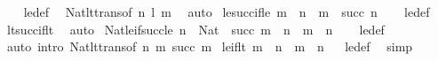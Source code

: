\begin{isabellebody}
%
\isadelimproof
\ \ %
\endisadelimproof
%
\isatagproof
{}\isamarkupfalse%
\ le{\isacharunderscore}{\kern0pt}def\ \isamarkupfalse%
\ Nat{\isacharunderscore}{\kern0pt}lt{\isacharunderscore}{\kern0pt}trans{\isacharbrackleft}{\kern0pt}of\ n\ l\ m{\isacharbrackright}{\kern0pt}\ \isamarkupfalse%
\ auto%
\endisatagproof
{\isafoldproof}%
%
\isadelimproof
\isanewline
%
\endisadelimproof
\isanewline
{}\isamarkupfalse%
\ le{\isacharunderscore}{\kern0pt}succ{\isacharunderscore}{\kern0pt}if{\isacharunderscore}{\kern0pt}le{\isacharcolon}{\kern0pt}\ {\isachardoublequoteopen}m\ {\isasymle}\ n\ {\isasymLongrightarrow}\ m\ {\isasymle}\ succ\ n{\isachardoublequoteclose}\isanewline
%
\isadelimproof
\ \ %
\endisadelimproof
%
\isatagproof
{}\isamarkupfalse%
\ le{\isacharunderscore}{\kern0pt}def\ \isamarkupfalse%
\ lt{\isacharunderscore}{\kern0pt}succ{\isacharunderscore}{\kern0pt}if{\isacharunderscore}{\kern0pt}lt\ \isamarkupfalse%
\ auto%
\endisatagproof
{\isafoldproof}%
%
\isadelimproof
\isanewline
%
\endisadelimproof
\isanewline
{}\isamarkupfalse%
\ Nat{\isacharunderscore}{\kern0pt}le{\isacharunderscore}{\kern0pt}if{\isacharunderscore}{\kern0pt}succ{\isacharunderscore}{\kern0pt}le{\isacharcolon}{\kern0pt}\ {\isachardoublequoteopen}n\ {\isacharcolon}{\kern0pt}\ Nat\ {\isasymLongrightarrow}\ succ\ m\ {\isasymle}\ n\ {\isasymLongrightarrow}\ m\ {\isasymle}\ n{\isachardoublequoteclose}\isanewline
%
\isadelimproof
\ \ %
\endisadelimproof
%
\isatagproof
{}\isamarkupfalse%
\ le{\isacharunderscore}{\kern0pt}def\ \isamarkupfalse%
\ {\isacharparenleft}{\kern0pt}auto\ intro{\isacharcolon}{\kern0pt}\ Nat{\isacharunderscore}{\kern0pt}lt{\isacharunderscore}{\kern0pt}trans{\isacharbrackleft}{\kern0pt}of\ n\ m\ {\isachardoublequoteopen}succ\ m{\isachardoublequoteclose}{\isacharbrackright}{\kern0pt}{\isacharparenright}{\kern0pt}%
\endisatagproof
{\isafoldproof}%
%
\isadelimproof
\isanewline
%
\endisadelimproof
\isanewline
{}\isamarkupfalse%
\ le{\isacharunderscore}{\kern0pt}if{\isacharunderscore}{\kern0pt}lt{\isacharcolon}{\kern0pt}\ {\isachardoublequoteopen}m\ {\isacharless}{\kern0pt}\ n\ {\isasymLongrightarrow}\ m\ {\isasymle}\ n{\isachardoublequoteclose}%
\isadelimproof
\ %
\endisadelimproof
%
\isatagproof
{}\isamarkupfalse%
\ le{\isacharunderscore}{\kern0pt}def\ \isamarkupfalse%
\ simp%
\endisatagproof
{\isafoldproof}%
%
\isadelimproof
%
\endisadelimproof
\isanewline

\end{isabellebody}
